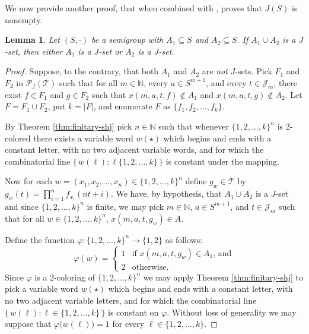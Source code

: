 \documentclass[12pt,showtrims]{memoir}
\theoremstyle{plain}
\newtheorem{lem}[thm]{Lemma}
\theoremstyle{definition}
\newcommand{\bbN}{\mathbb{N}}
\newcommand{\calJ}{\mathcal{J}}
\newcommand{\calT}{\mathcal{T}}
\newcommand{\Pf}{\mathcal{P}_f}
\begin{document}
We now provide another proof, that when combined with \cite[Theorem 3.11]{Hindman:1998fk}, proves that $J(S)$ is nonempty.

\begin{lem}
  \label{lem:pr-jsets}
  Let $(S, \cdot)$ be a semigroup with $A_1 \subseteq S$ and $A_2 \subseteq S$.
  If $A_1 \cup A_2$ is a $J$-set, then either $A_1$ is a $J$-set or $A_2$ is a $J$-set.
\end{lem}
\begin{proof}
  Suppose, to the contrary, that both $A_1$ and $A_2$ are \emph{not} $J$-sets.
  Pick $F_1$ and $F_2$ in $\Pf(\calT)$ such that for all $m \in \bbN$, every $a \in S^{m+1}$, and every $t \in \calJ_m$, there exist $f \in F_1$ and $g \in F_2$ such that $x(m, a, t, f) \not\in A_1$ and $x(m, a, t, g) \not\in A_2$.
  Let $F = F_1 \cup F_2$, put $k = |F|$, and enumerate $F$ as $\{f_1, f_2, \ldots, f_k\}$.

  By Theorem \ref{thm:finitary-shj} pick $n \in \bbN$ such that whenever $\{1, 2, \ldots, k\}^n$ is 2-colored there exists a variable word $w(\star)$ which begins and ends with a constant letter, with no two adjacent variable words, and for which the combinatorial line $\bigl\{\, w(\ell) : \ell \{1, 2, \ldots, k\} \,\bigr\}$ is constant under the mapping. 

  Now for each $w = (x_1, x_2, \ldots, x_n) \in \{1, 2, \ldots, k\}^n$ define $g_w \in \calT$ by $g_w(t) = \prod_{i=1}^n f_{x_i}(nt + i)$.
  We have, by hypothesis, that $A_1 \cup A_2$ is a $J$-set and since $\{1, 2, \ldots, k\}^n$ is finite, we may pick $m \in \bbN$, $a \in S^{m+1}$, and $t \in \calJ_m$ such that for all $w \in \{1, 2, \ldots, k\}^n$, $x(m, a, t, g_w) \in A$.

  Define the function $\varphi \colon \{1, 2, \ldots, k\}^n \to \{1, 2\}$ as follows:
  \[
    \varphi(w) = 
    \begin{cases}
      1 & \mbox{if $x(m, a, t, g_w) \in A_1$, and} \\
      2 & \mbox{otherwise.}
    \end{cases}
  \]
  Since $\varphi$ is a 2-coloring of $\{1, 2, \ldots, k\}^n$ we may apply Theorem \ref{thm:finitary-shj} to pick a variable word $w(\star)$ which begins and ends with a constant letter, with no two adjacent variable letters, and for which the combinatorial line $\bigl\{\, w(\ell) : \ell \in \{1, 2, \ldots, k\} \,\bigr\}$ is constant on $\varphi$. 
  Without loss of generality we may suppose that $\varphi \bigl( w(\ell) \bigr) = 1$ for every $\ell \in \{1, 2, \ldots, k\}$.


\end{proof}
\end{document}
